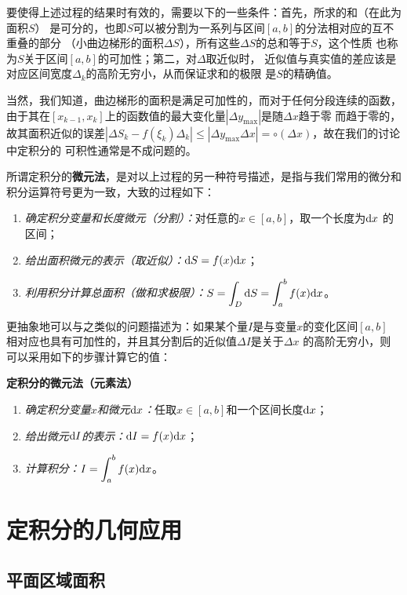 要使得上述过程的结果时有效的，需要以下的一些条件：首先，所求的和（在此为面积$S$）
是{\kaishu 可分的}，也即$S$可以被分割为一系列与区间$[a,b]$的分法相对应的互不重叠的部分
（小曲边梯形的面积$\Delta S$），所有这些$\Delta S$的总和等于$S$，这个性质
也称为$S$关于区间$[a,b]$的{\kaishu 可加性}；第二，对$\Delta $取近似时，
近似值与真实值的差应该是对应区间宽度$\Delta_k$的高阶无穷小，从而保证求和的极限
是$S$的精确值。

当然，我们知道，曲边梯形的面积是满足可加性的，而对于任何分段连续的函数，
由于其在$[x_{k-1},x_k]$上的函数值的最大变化量$|\Delta y_{\max}|$是随$\Delta x$趋于零
而趋于零的，故其面积近似的误差$|\Delta S_k-f(\xi_k)\Delta_k|\leq
|\Delta y_{\max}\Delta x|=\circ(\Delta x)$，故在我们的讨论中定积分的
可积性通常是不成问题的。

所谓定积分的{\bf 微元法}，是对以上过程的另一种符号描述，是指与我们常用的微分和
积分运算符号更为一致，大致的过程如下：

\begin{enumerate}
  \setlength{\itemindent}{1cm}
  \item {\it 确定积分变量和长度微元（分割）：}对任意的$x\in[a,b]$，取一个长度为$\mathrm{d} x$
  的区间；
  \item {\it 给出面积微元的表示（取近似）：}$\mathrm{d} S=f(x)\mathrm{d} x$；
  \item {\it 利用积分计算总面积（做和求极限）：}$S=\displaystyle\int_D\mathrm{d} S=\displaystyle\int_a^bf(x)\mathrm{d} x$。
\end{enumerate}

更抽象地可以与之类似的问题描述为：如果某个量$I$是与变量$x$的变化区间$[a,b]$
相对应也具有可加性的，并且其分割后的近似值$\Delta I$是关于$\Delta x$
的高阶无穷小，则可以采用如下的步骤计算它的值：

\begin{thx}
	{\bf 定积分的微元法（元素法）}
	\begin{enumerate}
		\item {\it 确定积分变量$x$和微元$\mathrm{d} x$：}任取$x\in[a,b]$和一个区间长度$\mathrm{d} x$；
  	    \item {\it 给出微元$\mathrm{d} I$的表示：}$\mathrm{d} I=f(x)\mathrm{d} x$；
  	    \item {\it 计算积分：}$I=\displaystyle\int_a^bf(x)\mathrm{d} x$。
	\end{enumerate}
\end{thx}

\section{定积分的几何应用}

\subsection{平面区域面积}


